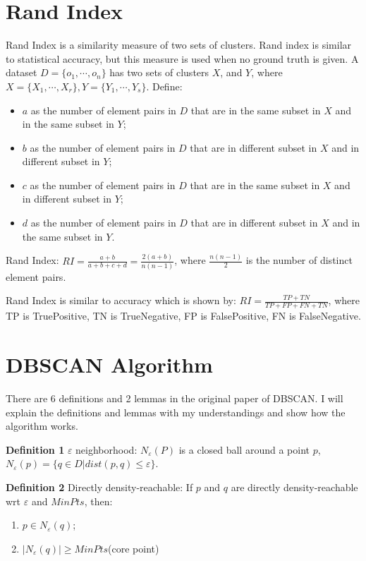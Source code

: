 \documentclass{article}
\begin{document}
\section{Rand Index}
Rand Index is a similarity measure of two sets of clusters. Rand index is similar to statistical accuracy, but this measure is used when no ground truth is given.
A dataset $D=\{o_1,\cdots,o_n\}$ has two sets of clusters $X$, and $Y$, where $X=\{X_1,\cdots,X_r\}, Y=\{Y_1,\cdots,Y_s\}$.
Define:
\begin{itemize}
\item $a$ as the number of element pairs in $D$ that are in the same subset in $X$ and in the same subset in $Y$;

\item $b$ as the number of element pairs in $D$ that are in different subset in $X$ and in different subset in $Y$;

\item $c$ as the number of element pairs in $D$ that are in the same subset in $X$ and in different subset in $Y$;

\item $d$ as the number of element pairs in $D$ that are in different subset in $X$ and in the same subset in $Y$.
\end{itemize}

Rand Index: $RI=\frac{a+b}{a+b+c+d}=\frac{2(a+b)}{n(n-1)}$, where $\frac{n(n-1)}{2}$ is the number of distinct element pairs.

Rand Index is similar to accuracy which is shown by: $RI=\frac{TP+TN}{TP+FP+FN+TN}$, where TP is TruePositive, TN is TrueNegative, FP is FalsePositive, FN is FalseNegative.
\section{DBSCAN Algorithm}


There are 6 definitions and 2 lemmas in the original paper of DBSCAN. I will explain the definitions and lemmas with my understandings and show how the algorithm works.


\noindent\textbf{Definition 1} $\varepsilon$ neighborhood: $N_\varepsilon(P)$ is a closed ball around a point $p$, $N_\varepsilon(p)=\{q\in D|dist(p,q)\leq\varepsilon\}$.



\noindent\textbf{Definition 2} Directly density-reachable: If $p$ and $q$ are directly density-reachable wrt $\varepsilon$ and $MinPts$, then:
\begin{enumerate}
\item $p\in N_\varepsilon(q)$;
\item $|N_\varepsilon(q)|\geq MinPts$(core point)
\end{enumerate}
\end{document}
